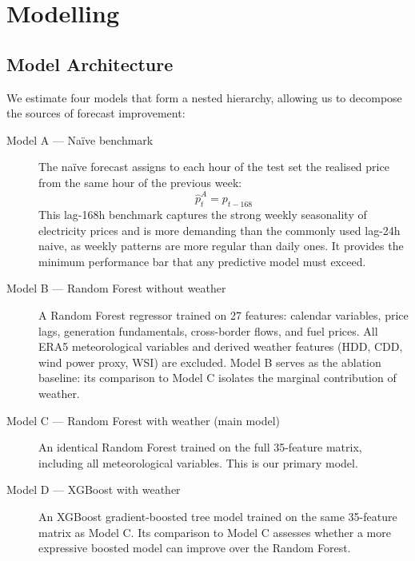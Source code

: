 \chapter{Modelling}
\label{chap:model}

\section{Model Architecture}

We estimate four models that form a nested hierarchy, allowing us to decompose the sources of forecast improvement:

\begin{description}
  \item[Model A — Na\"{i}ve benchmark] The na\"{i}ve forecast assigns to each hour of the test set the realised price from the same hour of the previous week:
  \begin{equation}
    \hat{p}_t^A = p_{t - 168}
  \end{equation}
  This lag-168h benchmark captures the strong weekly seasonality of electricity prices and is more demanding than the commonly used lag-24h naive, as weekly patterns are more regular than daily ones. It provides the minimum performance bar that any predictive model must exceed.

  \item[Model B — Random Forest without weather] A Random Forest regressor trained on 27 features: calendar variables, price lags, generation fundamentals, cross-border flows, and fuel prices. All ERA5 meteorological variables and derived weather features (HDD, CDD, wind power proxy, WSI) are excluded. Model B serves as the ablation baseline: its comparison to Model C isolates the marginal contribution of weather.

  \item[Model C — Random Forest with weather (main model)] An identical Random Forest trained on the full 35-feature matrix, including all meteorological variables. This is our primary model.

  \item[Model D — XGBoost with weather] An XGBoost gradient-boosted tree model trained on the same 35-feature matrix as Model C. Its comparison to Model C assesses whether a more expressive boosted model can improve over the Random Forest.
\end{description}


